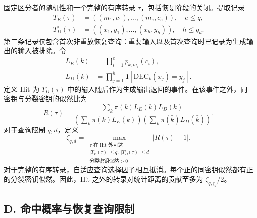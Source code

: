 固定区分者的随机性和一个完整的有序转录 \(\tau\)，包括恢复阶段的关闭。提取记录
\begin{equation}
\begin{aligned}
T_E(\tau) &= ((m_1, c_1), \ldots, (m_e, c_e)), \quad e \le q, \\
T_D^\circ(\tau) &= ((x_1, y_1), \ldots, (x_h, y_h)), \quad h \le q_d.
\end{aligned} \tag{48}
\end{equation}
第二条记录仅包含首次非重放恢复查询：重复输入以及首次查询时已记录为生成输出的输入被排除。令
\begin{equation}
\begin{aligned}
L_E(k) &= \prod_{i=1}^e p_{k,m_i}(c_i), \\
L_D(k) &= \prod_{j=1}^h \mathbf{1}[\mathrm{DEC}_k(x_j) = y_j].
\end{aligned} \tag{49}
\end{equation}
定义 \(\mathrm{Hit}\) 为 \(T_D^\circ(\tau)\) 中的输入随后作为生成输出返回的事件。在该事件之外，同密钥与分裂密钥的似然比为
\begin{equation}
R(\tau) = \frac{\sum_k \pi(k) L_E(k) L_D(k)}{\left( \sum_k \pi(k) L_E(k) \right) \left( \sum_k \pi(\bar{k}) L_D(\bar{k}) \right)}. \tag{50}
\end{equation}
对于查询限制 \(q, d\)，定义
\begin{equation}
\zeta_{q,d} = \max_{\substack{\tau \text{ 在 Hit 外可达} \\ |T_E(\tau)| \le q, \ |T_D^\circ(\tau)| \le d \\ \text{分裂密钥似然} > 0}} |R(\tau) - 1|. \tag{51}
\end{equation}
对于完整的有序转录，自适应查询选择因子相互抵消。每个正的同密钥似然都有正的分裂密钥似然。因此，\(\mathrm{Hit}\) 之外的转录对统计距离的贡献至多为 \(\zeta_{q, q_d} / 2\)。

\subsection*{D. 命中概率与恢复查询限制}

